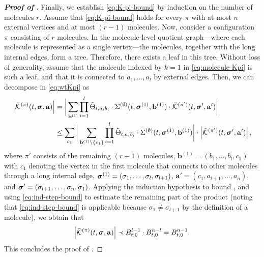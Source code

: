 \begin{proof}[\bf Proof of ]
Finally, we establish \eqref{eq:K-pi-bound} by induction on the number of molecules $r$. 
Assume that \eqref{eq:K-pi-bound} holds for every $\pi$ with at most $n$ external vertices and at most $(r-1)$ molecules. 
Now, consider a configuration $\pi$ consisting of $r$ molecules. In the molecule-level quotient graph---where each molecule is represented as a single vertex---the molecules, together with the long internal edges, form a tree. Therefore, there exists a leaf in this tree. Without loss of generality, assume that the molecule indexed by $k=1$ in \eqref{eq:molecule-Kpi} is such a leaf, and that it is connected to $ a_1, \ldots, a_{l}$ by external edges. 
Then, we can decompose  in \eqref{eq:wtKpi} as  
\begin{align}
    \left|\tilde{\mathcal{K}}^{(\pi)}(t, {\boldsymbol{\sigma}}, \mathbf{a})\right| &= \bigg|\sum_{\mathbf{b}^{(1)}} \prod_{i=1}^l \tilde{\Theta}_{t,a_i b_i} \cdot \Sigma^{(\emptyset)}(t, {\boldsymbol{\sigma}}^{(1)}, \mathbf{b}^{(1)}) \cdot\tilde{\mathcal{K}}^{(\pi')}(t, {\boldsymbol{\sigma}}', \mathbf{a}')\bigg| \nonumber\\
    &\le \sum_{c_1}\bigg|\sum_{\mathbf{b}^{(1)}\setminus \{c_1\}} \prod_{i=1}^l \tilde{\Theta}_{t,a_i b_i} \cdot \Sigma^{(\emptyset)}(t, {\boldsymbol{\sigma}}^{(1)}, \mathbf{b}^{(1)})\bigg| \cdot\left|\tilde{\mathcal{K}}^{(\pi')}(t, {\boldsymbol{\sigma}}', \mathbf{a}')\right|, \label{eq:Kpipi}
\end{align}
where $\pi'$ consists of the remaining $(r-1)$ molecules, $\mathbf{b}^{(1)} = (b_1,\ldots, b_l,c_1)$ with $c_1$ denoting the vertex in the first molecule that connects to other molecules through a long internal edge, ${\boldsymbol{\sigma}}^{(1)}=(\sigma_1,\ldots,\sigma_l,\sigma_{l+1})$, $\mathbf{a}' = (c_1, a_{l+1}, \ldots, a_{n})$, and ${\boldsymbol{\sigma}}' = (\sigma_{l+1}, \ldots, \sigma_n,\sigma_1)$.  
Applying the induction hypothesis to bound , and using \eqref{eq:ind-step-bound} to estimate the remaining part of the product (noting that \eqref{eq:ind-step-bound} is applicable because $\sigma_1 \neq \sigma_{l+1}$ by the definition of a molecule), we obtain that 
\begin{equation*}
    \left|\tilde{\mathcal{K}}^{(\pi)}(t, {\boldsymbol{\sigma}}, \mathbf{a})\right| \prec B_{t, 0}^{l-1} \cdot B_{t, 0}^{n-l} = B_{t, 0}^{n-1}.
\end{equation*}
This concludes the proof of .
\end{proof}

